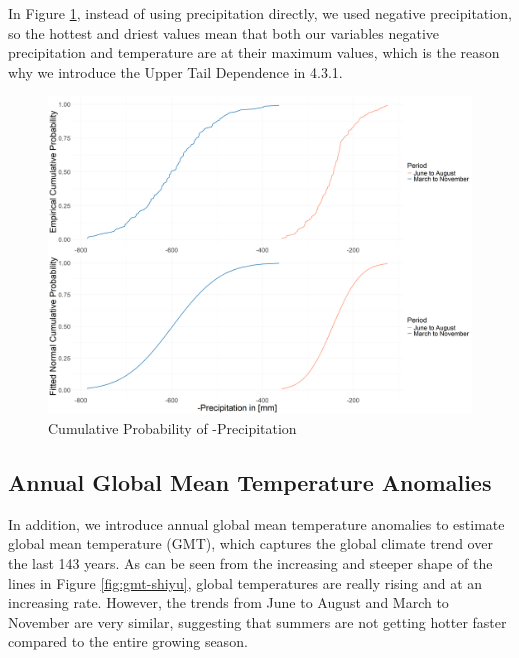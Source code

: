 \documentclass[
]{krantz}
\begin{document}
In Figure \ref{fig:PrecipitationCPD-shiyu}, instead of using precipitation directly, we used negative precipitation, so the hottest and driest values mean that both our variables negative precipitation and temperature are at their maximum values, which is the reason why we introduce the Upper Tail Dependence in 4.3.1.

\begin{figure}

{\centering \includegraphics[width=0.65\linewidth]{work/03-compounds/figures/Precipitation/Average/PrecipitationCPD} 

}

\caption{Cumulative Probability of -Precipitation}\label{fig:PrecipitationCPD-shiyu}
\end{figure}

\subsection{Annual Global Mean Temperature Anomalies}\label{annual-global-mean-temperature-anomalies}

In addition, we introduce annual global mean temperature anomalies to estimate global mean temperature (GMT), which captures the global climate trend over the last 143 years. As can be seen from the increasing and steeper shape of the lines in Figure \ref{fig:gmt-shiyu}, global temperatures are really rising and at an increasing rate. However, the trends from June to August and March to November are very similar, suggesting that summers are not getting hotter faster compared to the entire growing season.
\end{document}
